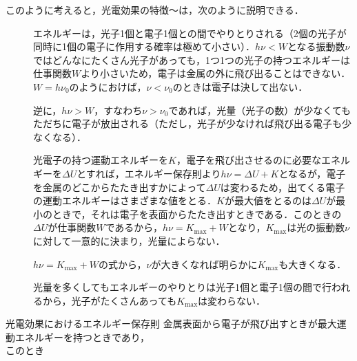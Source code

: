 このように考えると，光電効果の特徴〜は，次のように説明できる．
\begin{description}
\item[] エネルギーは，{\gtfamily 光子1個と電子1個との間でやりとりされる}（2個の光子が同時に1個の電子に作用する確率は極めて小さい）．$h\nu<W$となる振動数$\nu$ではどんなにたくさん光子があっても，1つ1つの光子の持つエネルギーは仕事関数$W$より小さいため，電子は金属の外に飛び出ることはできない．$W=h\nu_0$のようにおけば，$\nu<\nu_0$のときは電子は決して出ない．
\item[] 逆に，$h\nu>W$，すなわち$\nu>\nu_0$であれば，光量（光子の数）が少なくてもただちに電子が放出される（ただし，光子が少なければ飛び出る電子も少なくなる）．
\item[] 光電子の持つ運動エネルギーを$K$，電子を飛び出させるのに必要なエネルギーを$\Delta U$とすれば，エネルギー保存則より$h\nu=\Delta U+K$となるが，電子を金属のどこからたたき出すかによって$\Delta U$は変わるため，出てくる電子の運動エネルギーはさまざまな値をとる．$K$が最大値をとるのは$\Delta U$が最小のときで，それは電子を表面からたたき出すときである．このときの$\Delta U$が仕事関数$W$であるから，$h\nu=K_{\max}+W$となり，$K_{\max}$は光の振動数$\nu$に対して一意的に決まり，光量によらない．
\item[] $h\nu=K_{\max}+W$の式から，$\nu$が大きくなれば明らかに$K_{\max}$も大きくなる．
\item[] 光量を多くしてもエネルギーのやりとりは光子1個と電子1個の間で行われるから，光子がたくさんあっても$K_{\max}$は変わらない．
\end{description}

\bsNeed{24mm}
\begin{matome}{光電効果におけるエネルギー保存則}
 \hspace{3mm} 金属表面から電子が飛び出すときが最大運動エネルギーを持つときであり，\\
 \hspace{3mm} このとき\quad {}
\end{matome}

